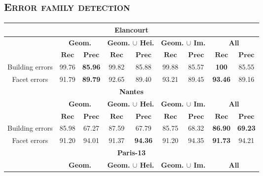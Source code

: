     \subsection{\textsc{Error family detection}}
        \label{subsec::more_experiments::finesse::2}
        \begin{table}[htbp]
            \centering
            \begin{tabular}{|c | c c | c c | c c | c c |}
                \hline
                \multicolumn{9}{|c|}{\textbf{Elancourt}}\\
                \hline
                &\multicolumn{2}{c|}{\textbf{Geom.}} & \multicolumn{2}{c|}{\textbf{Geom. $\cup$ Hei.}} & \multicolumn{2}{c|}{\textbf{Geom. $\cup$ Im.}} & \multicolumn{2}{x{1.8cm}|}{\textbf{All}}\\
                \cline{2-9}
                & \(\bm{Rec}\) & \(\bm{Prec}\) &  \(\bm{Rec}\) & \(\bm{Prec}\) &  \(\bm{Rec}\) & \(\bm{Prec}\) &  \(\bm{Rec}\) & \(\bm{Prec}\) \\
                \hline
                Building errors & 99.76 & \textbf{85.96} & 99.82 & 85.88 & 99.88 & 85.57 & \textbf{100} & 85.55 \\
                \hline
                Facet errors & 91.79 & \textbf{89.79} & 92.65 & 89.40 & 93.21 & 89.45 & \textbf{93.46} & 89.16 \\
                \hline
                \hline
                \multicolumn{9}{|c|}{\textbf{Nantes}}\\
                \hline
                &\multicolumn{2}{c|}{\textbf{Geom.}} & \multicolumn{2}{c|}{\textbf{Geom. $\cup$ Hei.}} & \multicolumn{2}{c|}{\textbf{Geom. $\cup$ Im.}} & \multicolumn{2}{x{1.8cm}|}{\textbf{All}}\\
                \cline{2-9}
                & \(\bm{Rec}\) & \(\bm{Prec}\) &  \(\bm{Rec}\) & \(\bm{Prec}\) &  \(\bm{Rec}\) & \(\bm{Prec}\) &  \(\bm{Rec}\) & \(\bm{Prec}\) \\
                \hline
                Building errors & 85.98 & 67.27 & 87.59 & 67.79 & 85.75 & 68.32 & \textbf{86.90} & \textbf{69.23} \\
                \hline
                Facet errors & 91.20 & 94.01 & 91.37 & \textbf{94.36} & 91.20 & 94.35 & \textbf{91.73} & 94.21\\
                \hline
                \hline
                \multicolumn{9}{|c|}{\textbf{Paris-13}}\\
                \hline
                &\multicolumn{2}{c|}{\textbf{Geom.}} & \multicolumn{2}{c|}{\textbf{Geom. $\cup$ Hei.}} & \multicolumn{2}{c|}{\textbf{Geom. $\cup$ Im.}} & \multicolumn{2}{x{1.8cm}|}{\textbf{All}}\\

\end{tabular}
\end{table}
